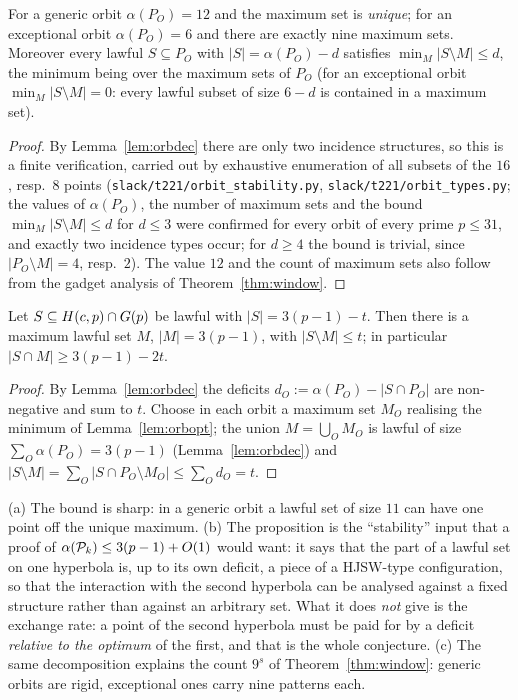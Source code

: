 \begin{lemma}\label{lem:orbopt}
For a generic orbit $\alpha(P_O)=12$ and the maximum set is \emph{unique}; for an exceptional orbit $\alpha(P_O)=6$ and there are exactly
nine maximum sets.  Moreover every lawful $S\subseteq P_O$ with $|S|=\alpha(P_O)-d$ satisfies $\min_M|S\setminus M|\le d$, the minimum
being over the maximum sets of $P_O$ (for an exceptional orbit $\min_M|S\setminus M|=0$: every lawful subset of size $6-d$ is contained in
a maximum set).
\end{lemma}
\begin{proof}
By Lemma~\ref{lem:orbdec} there are only two incidence structures, so this is a finite verification, carried out by exhaustive enumeration
of all subsets of the $16$, resp.\ $8$ points (\texttt{slack/\allowbreak t221/\allowbreak orbit\_\allowbreak stability.py}, \texttt{slack/\allowbreak t221/\allowbreak orbit\_\allowbreak types.py}; the values of
$\alpha(P_O)$, the number of maximum sets and the bound $\min_M|S\setminus M|\le d$ for $d\le3$ were confirmed for every orbit of every
prime $p\le31$, and exactly two incidence types occur; for $d\ge4$ the bound is trivial, since $|P_O\setminus M|=4$, resp.\ $2$).
The value $12$ and the count of maximum sets also follow from the gadget analysis of Theorem~\ref{thm:window}.
\end{proof}

\begin{proposition}[stability]\label{prop:stability}
Let $S\subseteq H(c,p)\cap G(p)$ be lawful with $|S|=3(p-1)-t$.  Then there is a maximum lawful set $M$,
$|M|=3(p-1)$, with $|S\setminus M|\le t$; in particular $|S\cap M|\ge3(p-1)-2t$.
\end{proposition}
\begin{proof}
By Lemma~\ref{lem:orbdec} the deficits $d_O:=\alpha(P_O)-|S\cap P_O|$ are non-negative and sum to $t$.  Choose in each orbit a maximum
set $M_O$ realising the minimum of Lemma~\ref{lem:orbopt}; the union $M=\bigcup_OM_O$ is lawful of size $\sum_O\alpha(P_O)=3(p-1)$
(Lemma~\ref{lem:orbdec}) and $|S\setminus M|=\sum_O|S\cap P_O\setminus M_O|\le\sum_Od_O=t$.
\end{proof}

\begin{remark}
(a) The bound is sharp: in a generic orbit a lawful set of size $11$ can have one point off the unique maximum.
(b) The proposition is the ``stability'' input that a proof of $\alpha(\mathcal{P}_k)\le3(p-1)+O(1)$ would want: it says that the part of a
lawful set on one hyperbola is, up to its own deficit, a piece of a HJSW-type configuration, so that the interaction with the second
hyperbola can be analysed against a fixed structure rather than against an arbitrary set.  What it does \emph{not} give is the exchange
rate: a point of the second hyperbola must be paid for by a deficit \emph{relative to the optimum} of the first, and that is the whole
conjecture.
(c) The same decomposition explains the count $9^s$ of Theorem~\ref{thm:window}: generic orbits are rigid, exceptional ones carry nine
patterns each.
\end{remark}
